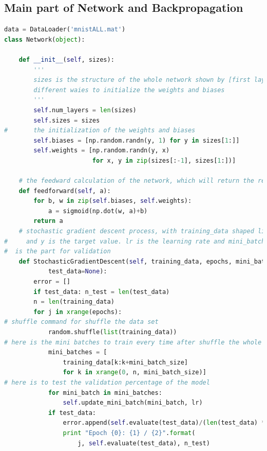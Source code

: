 \documentclass[12pt,a4paper]{article}
\begin{document}
\subsection{Main part of Network and Backpropagation}
\begin{lstlisting}[language=Python]
data = DataLoader('mnistALL.mat')
class Network(object):

    def __init__(self, sizes):
        '''
        sizes is the structure of the whole network shown by [first layer, second layer, ... , last year] as a list
        different waies to initialize the weights and biases
        '''
        self.num_layers = len(sizes)
        self.sizes = sizes
#       the initialization of the weights and biases
        self.biases = [np.random.randn(y, 1) for y in sizes[1:]]
        self.weights = [np.random.randn(y, x)
                        for x, y in zip(sizes[:-1], sizes[1:])]

    # the feedward calculation of the network, which will return the result to the last layer
    def feedforward(self, a):
        for b, w in zip(self.biases, self.weights):
            a = sigmoid(np.dot(w, a)+b)
        return a
    # stochastic gradient descent process, with training_data shaped like (x,y), x is the traing data,
#     and y is the target value. lr is the learning rate and mini_batch_size is mini batch size. test_data
#  is the part for validation
    def StochasticGradientDescent(self, training_data, epochs, mini_batch_size, lr,
            test_data=None):
        error = []
        if test_data: n_test = len(test_data)
        n = len(training_data)
        for j in xrange(epochs):
# shuffle command for shuffle the data set
            random.shuffle(list(training_data))
# here is the mini batches to train every time after shuffle the whole training set
            mini_batches = [
                training_data[k:k+mini_batch_size]
                for k in xrange(0, n, mini_batch_size)]
# here is to test the validation percentage of the model
            for mini_batch in mini_batches:
                self.update_mini_batch(mini_batch, lr)
            if test_data:
                error.append(self.evaluate(test_data)/(len(test_data) * 1.0))
                print "Epoch {0}: {1} / {2}".format(
                    j, self.evaluate(test_data), n_test)
                

\end{lstlisting}
\end{document}
